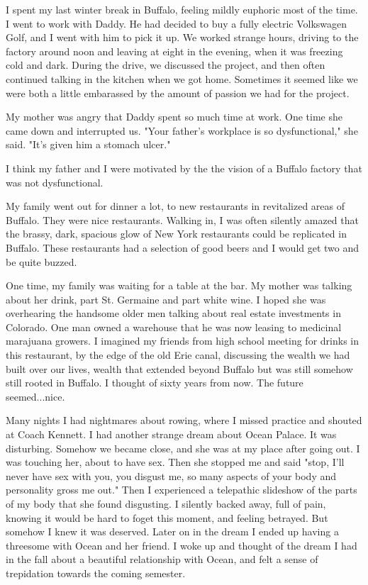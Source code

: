 \documentclass[12pt]{article}
\begin{document}
I spent my last winter break in Buffalo, feeling mildly euphoric most of the
time.  I went to work with Daddy.  He had decided to buy a fully electric
Volkswagen Golf, and I went with him to pick it up.  We worked strange hours,
driving to the factory around noon and leaving at eight in the evening, when it
was freezing cold and dark.  During the drive, we discussed the project, and
then often continued talking in the kitchen when we got home.  Sometimes it
seemed like we were both a little embarassed by the amount of passion we
had for the project. 

My mother was angry that Daddy spent so much time at work.  One time she
came down and interrupted us.  "Your father's workplace is so dysfunctional,"
she said.  "It's given him a stomach ulcer."  

I think my father and I were motivated by the the vision of a Buffalo factory
that was not dysfunctional. 

My family went out for dinner a lot, to new restaurants in revitalized areas of
Buffalo.  They were nice restaurants.  Walking in, I was often silently amazed
that the brassy, dark, spacious glow of New York restaurants could be replicated
in Buffalo.  These restaurants had a selection of good beers and I would get two
and be quite buzzed.

One time, my family was waiting for a table at the bar.  My mother was talking
about her drink, part St. Germaine and part white wine.  I hoped she was
overhearing the handsome older men talking about real estate investments in
Colorado.  One man owned a warehouse that he was now leasing to medicinal
marajuana growers.  I imagined my friends from high school meeting for drinks in
this restaurant, by the edge of the old Erie canal, discussing the wealth we had
built over our lives, wealth that extended beyond Buffalo but was still somehow
still rooted in Buffalo.  I thought of sixty years from now.  The future
seemed...nice.

Many nights I had nightmares about rowing, where I missed practice and shouted
at Coach Kennett.  I had another strange dream about Ocean Palace.  It was
disturbing.  Somehow we became close, and she was at my place after going out.
I was touching her, about to have sex.  Then she stopped me and said "stop, I'll
never have sex with you, you disgust me, so many aspects of your body and
personality gross me out."  Then I experienced a telepathic slideshow of the
parts of my body that she found disgusting.  I silently backed away, full of
pain, knowing it would be hard to foget this moment, and feeling betrayed. But
somehow I knew it was deserved.  Later on in the dream I ended up having a
threesome with Ocean and her friend.  I woke up and thought of the dream I had
in the fall about a beautiful relationship with Ocean, and felt a sense of
trepidation towards the coming semester.
\end{document}
